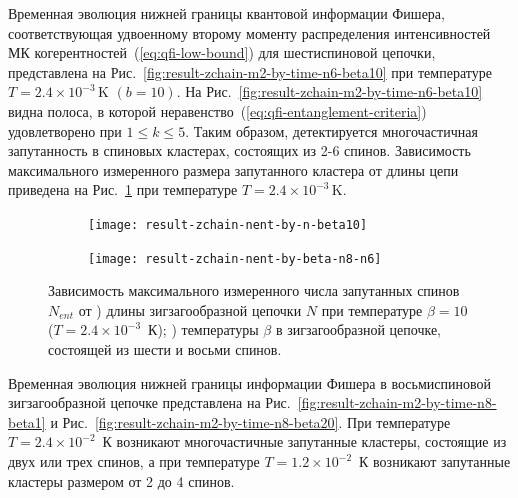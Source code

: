 
Временная эволюция нижней границы квантовой информации Фишера,
соответствующая  удвоенному второму моменту распределения интенсивностей МК когерентностей~(\ref{eq:qfi-low-bound}) для шестиспиновой цепочки, представлена на Рис.~\ref{fig:result-zchain-m2-by-time-n6-beta10} при температуре $T = 2.4\times 10^{-3}\,\mbox{K}$ $(b=10)$.
На Рис.~\ref{fig:result-zchain-m2-by-time-n6-beta10} видна полоса,
в которой неравенство~(\ref{eq:qfi-entanglement-criteria}) удовлетворено при $1\leqslant k \leqslant 5$.
Таким образом, детектируется многочастичная запутанность в спиновых кластерах, состоящих из 2-6 спинов.
Зависимость максимального измеренного размера запутанного кластера от длины цепи приведена на Рис.~\ref{fig:result-zchain-nent-by-n-beta10} при температуре $T = 2.4\times 10^{-3}\,\mbox{K}$.

\begin{figure}[H]
  \begin{subfigure}[t]{0.48\textwidth}
    \centering
    \texttt{[image: result-zchain-nent-by-n-beta10]}
    \caption{}
    \label{fig:result-zchain-nent-by-n-beta10}
  \end{subfigure}
  \hfill
  \begin{subfigure}[t]{0.48\textwidth}
    \centering
    \texttt{[image: result-zchain-nent-by-beta-n8-n6]}
    \caption{}
    \label{fig:result-zchain-nent-by-beta-n8-n6}
  \end{subfigure}
  \caption{
    Зависимость максимального измеренного числа запутанных спинов~$N_{ent}$ от
    ) длины зигзагообразной цепочки $N$ при температуре $\beta = 10$ ($T = 2.4\times 10^{-3}$~К);
    ) температуры $\beta$
    в зигзагообразной цепочке,
    состоящей из шести и восьми спинов.
  }
\end{figure}

Временная эволюция нижней границы информации Фишера в восьмиспиновой зигзагообразной цепочке представлена на Рис.~\ref{fig:result-zchain-m2-by-time-n8-beta1}
и Рис.~\ref{fig:result-zchain-m2-by-time-n8-beta20}.
При температуре $T=2.4\times 10^{-2}$~К возникают многочастичные запутанные кластеры,
состоящие из двух или трех спинов,
а при температуре $T=1.2\times 10^{-2}$~К возникают запутанные кластеры размером от 2 до 4 спинов.

